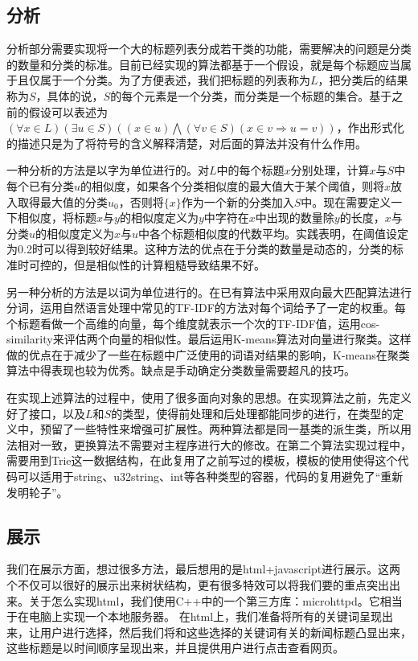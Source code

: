 \documentclass[12pt]{article}
\begin{document}
\subsection{分析}
分析部分需要实现将一个大的标题列表分成若干类的功能，需要解决的问题是分类的数量和分类的标准。目前已经实现的算法都基于一个假设，就是每个标题应当属于且仅属于一个分类。为了方便表述，我们把标题的列表称为$L$，把分类后的结果称为$S$，具体的说，$S$的每个元素是一个分类，而分类是一个标题的集合。基于之前的假设可以表述为$(\forall x \in L)(\exists u \in S)((x \in u )\bigwedge(\forall v \in S) (x \in v \Rightarrow u = v))$，作出形式化的描述只是为了将符号的含义解释清楚，对后面的算法并没有什么作用。

一种分析的方法是以字为单位进行的。对$L$中的每个标题$x$分别处理，计算$x$与$S$中每个已有分类$u$的相似度，如果各个分类相似度的最大值大于某个阈值，则将$x$放入取得最大值的分类$u_0$，否则将$\lbrace x\rbrace$作为一个新的分类加入$S$中。现在需要定义一下相似度，将标题$x$与$y$的相似度定义为$y$中字符在$x$中出现的数量除$y$的长度，$x$与分类$u$的相似度定义为$x$与$u$中各个标题相似度的代数平均。实践表明，在阈值设定为0.2时可以得到较好结果。这种方法的优点在于分类的数量是动态的，分类的标准时可控的，但是相似性的计算粗糙导致结果不好。

另一种分析的方法是以词为单位进行的。在已有算法中采用双向最大匹配算法进行分词，运用自然语言处理中常见的TF-IDF的方法对每个词给予了一定的权重。每个标题看做一个高维的向量，每个维度就表示一个次的TF-IDF值，运用cos-similarity来评估两个向量的相似性。最后运用K-means算法对向量进行聚类。这样做的优点在于减少了一些在标题中广泛使用的词语对结果的影响，K-means在聚类算法中得表现也较为优秀。缺点是手动确定分类数量需要超凡的技巧。

在实现上述算法的过程中，使用了很多面向对象的思想。在实现算法之前，先定义好了接口，以及$L$和$S$的类型，使得前处理和后处理都能同步的进行，在类型的定义中，预留了一些特性来增强可扩展性。两种算法都是同一基类的派生类，所以用法相对一致，更换算法不需要对主程序进行大的修改。在第二个算法实现过程中，需要用到Trie这一数据结构，在此复用了之前写过的模板，模板的使用使得这个代码可以适用于string、u32string、int等各种类型的容器，代码的复用避免了“重新发明轮子”。
\subsection{展示}
我们在展示方面，想过很多方法，最后想用的是html+javascript进行展示。这两个不仅可以很好的展示出来树状结构，更有很多特效可以将我们要的重点突出出来。关于怎么实现html，我们使用C++中的一个第三方库：microhttpd。它相当于在电脑上实现一个本地服务器。
在html上，我们准备将所有的关键词呈现出来，让用户进行选择，然后我们将和这些选择的关键词有关的新闻标题凸显出来，这些标题是以时间顺序呈现出来，并且提供用户进行点击查看网页。
\end{document}
